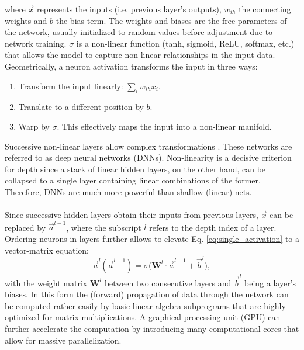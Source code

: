 \documentclass[../../main.tex]{subfiles}
\begin{document}
where $\vec{x}$ represents the inputs (i.e. previous layer's outputs), $w_{ih}$ the connecting weights and $b$ the bias term. The weights and biases are the free parameters of the network, usually initialized to random values before adjustment due to network training. $\sigma$ is a non-linear function (tanh, sigmoid, ReLU, softmax, etc.) that allows the model to capture non-linear relationships in the input data. Geometrically, a neuron activation transforms the input in three ways:
\begin{enumerate}
	\item Transform the input linearly: $\sum_i{w_{ih}x_i}$.
	\item Translate to a different position by $b$.
	\item Warp by $\sigma$. This effectively maps the input into a non-linear manifold.
\end{enumerate}
Successive non-linear layers allow complex transformations \cite{colah_nn}. These networks are referred to as deep neural networks (DNNs). Non-linearity is a decisive criterion for depth since a stack of linear hidden layers, on the other hand, can be collapsed to a single layer containing linear combinations of the former. Therefore, DNNs are much more powerful than shallow (linear) nets.\\
\\
Since successive hidden layers obtain their inputs from previous layers, $\vec{x}$ can be replaced by $\vec{a}^{l-1}$, where the subscript $l$ refers to the depth index of a layer. Ordering neurons in layers further allows to elevate Eq. \ref{eq:single_activation} to a vector-matrix equation:
\begin{equation}
	\vec{a}^l(\vec{a}^{l-1}) = \sigma\big({\textbf{W}^l\cdot \vec{a}^{l-1}+\vec{b}^l}\big),
	\label{eq:vec_activation}
\end{equation}
with the weight matrix $\textbf{W}^l$ between two consecutive layers and $\vec{b}^l$ being a layer's biases. In this form the (forward) propagation of data through the network can be computed rather easily by basic linear algebra subprograms that are highly optimized for matrix multiplications. A graphical processing unit (GPU) can further accelerate the computation by introducing many computational cores that allow for massive parallelization.\\
\\
\end{document}
